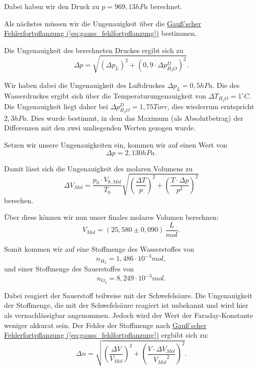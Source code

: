 Dabei haben wir den Druck zu $p = 969,13 hPa$ berechnet.

Als nächstes müssen wir die Ungenauigkeit über die \hyperref[eq:gauss_fehlfortpflanzung]{Gauß'scher Fehlerfortpflanzung (\ref*{eq:gauss_fehlfortpflanzung})} bestimmen. 

Die Ungenauigkeit des berechneten Druckes ergibt sich zu
\begin{equation}
    \Delta p = \sqrt{(\Delta p_L)^2 + (0,9 \cdot \Delta p_{H_2O}^D)^2}.
\end{equation}

Wir haben dabei die Ungenauigkeit des Luftdruckes $\Delta p_L = 0,5 hPa$. Die des Wasserdruckes ergibt sich über die Temperaturungenauigkeit von $\Delta T_{H_2O} =1^\circ C$.
Die Ungenauigkeit liegt daher bei $\Delta p_{H_2O}^D = 1,75 Torr$, dies wiederrum erntspricht $2,3 hPa$. Dies wurde bestimmt, in dem das Maximum (als Absolutbetrag) der Differenzen mit den zwei umliegenden Werten gezogen wurde.

Setzen wir unsere Ungenauigkeiten ein, kommen wir auf einen Wert von
\begin{equation}
    \Delta p = 2,130 hPa.
\end{equation}

Damit lässt sich die Ungenauigkeit des molaren Volumens zu 
\begin{equation}
    \Delta V_{Mol} = \frac{p_0 \cdot V_{0,Mol}}{T_0} \sqrt{\left(\frac{\Delta T}{p}\right)^2 + \left(\frac{T \cdot \Delta p}{p^2}\right)^2}
\end{equation}  
berechen.

Über diese können wir nun unser finales molares Volumen berechnen:
\begin{equation}
\boxed{
    V_{Mol} = (25,580 \pm 0,090)\, \frac{L}{mol}.
}
\end{equation}

Somit kommen wir auf eine Stoffmenge des Wasserstoffes von
\begin{equation}
    n_{H_2} = 1,486 \cdot 10^{-3} mol, 
\end{equation}
und einer Stoffmenge des Sauerstoffes von 
\begin{equation}
    n_{O_2} = 8,249 \cdot 10^{-3} mol.
\end{equation}

Dabei reagiert der Sauerstoff teilweise mit der Schwefelsäure. Die Ungenauigkeit der Stoffmenge, die mit der Schwefelsäure reagiert ist unbekannt und wird hier als vernachlässigbar angenommen. Jedoch wird der Wert der Faraday-Konstante weniger akkurat sein.
Der Fehler der Stoffmenge nach \hyperref[eq:gauss_fehlfortpflanzung]{Gauß'scher Fehlerfortpflanzung (\ref*{eq:gauss_fehlfortpflanzung})} ergbibt sich zu:
\begin{equation}
    \Delta n = \sqrt{\left(\frac{\Delta V}{V_{Mol}}\right)^2 + \left(\frac{V \cdot \Delta V_{Mol}}{{V_{Mol}}^2}\right)^2}.
\end{equation}


